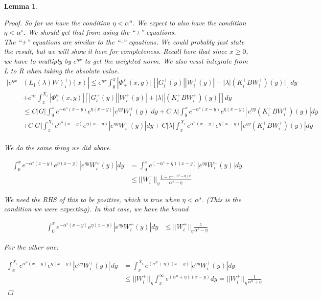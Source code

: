 \documentclass[12pt]{article}
\newtheorem{lemma}{Lemma}
\begin{document}
\begin{lemma}
\begin{proof}
So far we have the condition $\eta < \alpha^u$. We expect to also have the condition $\eta < \alpha^s$. We should get that from using the ``+'' equations.\\

The ``+'' equations are similar to the ``-'' equations. We could probably just state the result, but we will show it here for completeness. Recall here that since $x \geq 0$, we have to multiply by $e^{\eta x}$ to get the weighted norm. We also must integrate from L to R when taking the absolute value.\\

\begin{align*}
|e^{\eta x} & (L_1(\lambda)W)_i^+)(x) | \leq e^{\eta x} \int_0^x |\Phi^s_+(x, y)|[|G_i^+(y)||W_i^+(y)| + |\lambda|(K_i^+ B W_i^+)(y)| ] dy \\
&+ e^{\eta x} \int_x^{X_i} |\Phi^u_+(x, y)|[|G_i^+(y)||W_i^+(y)| + |\lambda||(K_i^+ B W_i^+)(y)| ] dy \\
&\leq C|G| \int_0^x e^{-\alpha^s (x-y)}e^{\eta(x-y)}|e^{\eta y} W_i^+(y)| dy 
+ C|\lambda|\int_0^x e^{-\alpha^s (x-y)}e^{\eta(x-y)}|e^{\eta y} (K_i^+ B W_i^+)(y)| dy \\
&+ C|G| \int_x^{X_i} e^{\alpha^u (x-y)}e^{\eta(x-y)}|e^{\eta y} W_i^+(y)| dy 
+ C|\lambda|\int_x^{X_i} e^{\alpha^u (x-y)}e^{\eta(x-y)}|e^{\eta y} (K_i^+ B W_i^+)(y)| dy \\ 
\end{align*}

We do the same thing we did above.

\begin{align*}
\int_0^x e^{-\alpha^s (x-y)}e^{\eta(x-y)}|e^{\eta y} W_i^+(y)| dy &= \int_0^x e^{(-\alpha^s + \eta) (x-y)}|e^{\eta y} W_i^-(y)| dy \\
&\leq ||W_i^+||_\eta \frac{1 - e^{-(\alpha^s - \eta)x} }{\alpha^s - \eta}
\end{align*}

We need the RHS of this to be positive, which is true when $\eta < \alpha^s$. (This is the condition we were expecting). In that case, we have the bound

\begin{align*}
\int_0^x e^{-\alpha^s (x-y)}e^{\eta(x-y)}|e^{\eta y} W_i^+(y)| dy &\leq ||W_i^+||_\eta \frac{1}{\alpha^s - \eta}
\end{align*}

For the other one:

\begin{align*}
\int_x^{X_i} e^{\alpha^u (x-y)}e^{\eta(x-y)}|e^{\eta y} W_i^+(y)| dy &= \int_x^{X_i} e^{(\alpha^u + \eta) (x-y)}|e^{\eta y} W_i^+(y)| dy \\
&\leq ||W_i^+||_\eta \int_x^{\infty} e^{(\alpha^u + \eta) (x-y)} dy = ||W_i^+||_\eta \frac{1}{\alpha^u + \eta}
\end{align*}


\end{proof}
\end{lemma}
\end{document}
